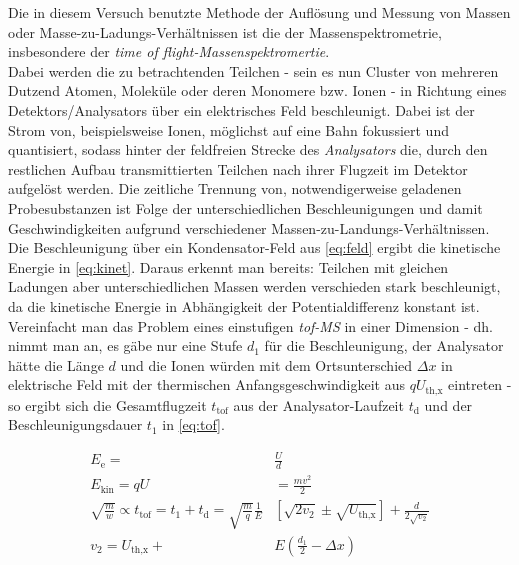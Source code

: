 \documentclass[numbers=noenddot,a4paper,notitlepage,twoside,BCOR15mm]{scrartcl}
\newcommand{\ix}[1]{_\text{#1}}
\newcommand{\tilt}[1]{\textit{#1}}
\begin{document}
		Die in diesem Versuch benutzte Methode der Auflösung und Messung von Massen oder Masse-zu-Ladungs-Verhältnissen ist die der Massenspektrometrie, insbesondere der \tilt{time of flight-Massenspektromertie}.\\
		Dabei werden die zu betrachtenden Teilchen - sein es nun Cluster von mehreren Dutzend Atomen, Moleküle oder deren Monomere bzw. Ionen - in Richtung eines Detektors/Analysators über ein elektrisches Feld beschleunigt. Dabei ist der Strom von, beispielsweise Ionen, möglichst auf eine Bahn fokussiert und quantisiert, sodass hinter der feldfreien Strecke des \tilt{Analysators} die, durch den restlichen Aufbau transmittierten Teilchen nach ihrer Flugzeit im Detektor aufgelöst werden. Die zeitliche Trennung von, notwendigerweise geladenen Probesubstanzen ist Folge der unterschiedlichen Beschleunigungen und damit Geschwindigkeiten aufgrund verschiedener Massen-zu-Landungs-Verhältnissen.\\
		Die Beschleunigung über ein Kondensator-Feld aus \autoref{eq:feld} ergibt die kinetische Energie in \autoref{eq:kinet}. Daraus erkennt man bereits: Teilchen mit gleichen Ladungen aber unterschiedlichen Massen werden verschieden stark beschleunigt, da die kinetische Energie in Abhängigkeit der Potentialdifferenz konstant ist. Vereinfacht man das Problem eines einstufigen \tilt{tof-MS} in einer Dimension - dh. nimmt man an, es gäbe nur eine Stufe $d\ix{1}$ für die Beschleunigung, der Analysator hätte die Länge $d$ und die Ionen würden mit dem Ortsunterschied $\Delta x$ in elektrische Feld mit der thermischen Anfangsgeschwindigkeit aus $qU\ix{th,x}$ eintreten - so ergibt sich die Gesamtflugzeit $t\ix{tof}$ aus der Analysator-Laufzeit $t\ix{d}$ und der Beschleunigungsdauer $t\ix{1}$ in \autoref{eq:tof}.

			\begin{align}
				E\ix{e}=&\frac{U}{d} \label{eq:feld}\\
				E\ix{kin}=qU&=\frac{mv^2}{2} \label{eq:kinet}\\
				\sqrt{\frac{m}{w}}\propto t\ix{tof}=t\ix{1}+t\ix{d}=\sqrt{\frac{m}{q}}\frac{1}{E}&\left[\sqrt{2v\ix{2}}\pm\sqrt{U\ix{th,x}}\right]+\frac{d}{2\sqrt{v\ix{2}}} \label{eq:tof}\\
				v\ix{2}=U\ix{th,x}+&E\left(\frac{d\ix{1}}{2}-\Delta x\right)
			\end{align}
\end{document}

